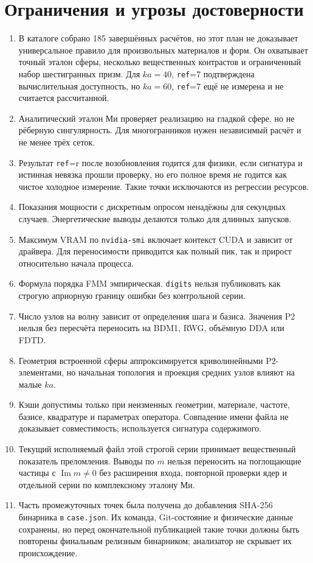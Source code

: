 \documentclass[12pt,a4paper]{article}
\begin{document}
\section{Ограничения и угрозы достоверности}

\begin{enumerate}
  \item В каталоге собрано 185 завершённых расчётов, но этот план не
        доказывает универсальное правило для произвольных материалов и форм.
        Он охватывает точный эталон сферы, несколько вещественных контрастов и
        ограниченный набор шестигранных призм. Для $ka=40$, \texttt{ref}=7
        подтверждена вычислительная доступность, но $ka=60$, \texttt{ref}=7
        ещё не измерена и не считается рассчитанной.
  \item Аналитический эталон Ми проверяет реализацию на гладкой сфере, но не
        рёберную сингулярность. Для многогранников нужен независимый расчёт и
        не менее трёх сеток.
  \item Результат \texttt{ref}=r после возобновления годится для физики, если
        сигнатура и истинная невязка прошли проверку, но его полное время не
        годится как чистое холодное измерение. Такие точки исключаются из
        регрессии ресурсов.
  \item Показания мощности с дискретным опросом ненадёжны для секундных
        случаев. Энергетические выводы делаются только для длинных запусков.
  \item Максимум VRAM по \texttt{nvidia-smi} включает контекст CUDA и зависит
        от драйвера. Для переносимости приводится как полный пик, так и прирост
        относительно начала процесса.
  \item Формула порядка FMM эмпирическая. \texttt{digits} нельзя публиковать
        как строгую априорную границу ошибки без контрольной серии.
  \item Число узлов на волну зависит от определения шага и базиса. Значения P2
        нельзя без пересчёта переносить на BDM1, RWG, объёмную DDA или FDTD.
  \item Геометрия встроенной сферы аппроксимируется криволинейными P2-элементами,
        но начальная топология и проекция средних узлов влияют на малые $ka$.
  \item Кэши допустимы только при неизменных геометрии, материале, частоте,
        базисе, квадратуре и параметрах оператора. Совпадение имени файла не
        доказывает совместимость; используется сигнатура содержимого.
  \item Текущий исполняемый файл этой строгой серии принимает вещественный
        показатель преломления. Выводы по $m$ нельзя переносить на поглощающие
        частицы с $\operatorname{Im}m\ne0$ без расширения входа, повторной
        проверки ядер и отдельной серии по комплексному эталону Ми.
  \item Часть промежуточных точек была получена до добавления SHA-256 бинарника
        в \texttt{case.json}. Их команда, Git-состояние и физические данные
        сохранены, но перед окончательной публикацией такие точки должны быть
        повторены финальным релизным бинарником; анализатор не скрывает их
        происхождение.
\end{enumerate}
\end{document}
